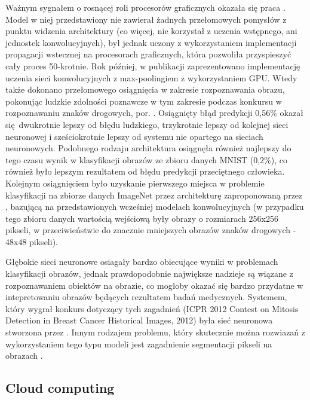 \documentclass[12pt,a4paper,twoside]{article}
\begin{document}
Ważnym sygnałem o rosnącej roli procesorów graficznych okazała się praca \citet{ciresan2010}. Model w niej przedstawiony nie zawierał żadnych przełomowych pomysłów z punktu widzenia architektury (co więcej, nie korzystał z uczenia wstępnego, ani jednostek konwolucyjnych), był jednak uczony z wykorzystaniem implementacji propagacji wstecznej na procesorach graficznych, która pozwoliła przyspieszyć cały proces 50-krotnie. Rok później, w publikacji \citet{ciresan2011a} zaprezentowano implementację uczenia sieci konwolucyjnych z max-poolingiem z wykorzystaniem GPU. Wtedy także dokonano przełomowego osiągnięcia w zakresie rozpoznawania obrazu, pokonując ludzkie zdolności poznawcze w tym zakresie podczas konkursu w rozpoznawaniu znaków drogowych, por. \citet{ciresan2011b}. Osiągnięty błąd predykcji 0,56\% okazał się dwukrotnie lepszy od błędu ludzkiego, trzykrotnie lepszy od kolejnej sieci neuronowej i sześciokrotnie lepszy od systemu nie opartego na sieciach neuronowych. Podobnego rodzaju architektura osiągnęła również najlepszy do tego czasu wynik w klasyfikacji obrazów ze zbioru danych MNIST
(0,2\%), co również było lepszym rezultatem od błędu predykcji przeciętnego człowieka.
Kolejnym osiągnięciem było uzyskanie pierwszego miejsca w problemie klasyfikacji na zbiorze danych ImageNet przez architekturę zaproponowaną przez \citet{krizhevsky2012}, bazującą na przedstawionych wcześniej modelach konwolucyjnych (w przypadku tego zbioru danych wartością wejściową były obrazy o rozmiarach 256x256 pikseli, w przeciwieństwie do znacznie mniejszych obrazów znaków drogowych - 48x48 pikseli).

Głębokie sieci neuronowe osiagały bardzo obiecujące wyniki w problemach klasyfikacji obrazów, jednak prawdopodobnie największe nadzieje są wiązane z rozpoznawaniem obiektów na obrazie, co mogłoby okazać się bardzo przydatne w intepretowaniu obrazów będących rezultatem badań medycznych. Systemem, który wygrał konkurs dotyczący tych zagadnień (ICPR 2012 Contest on Mitosis Detection in Breast Cancer Historical Images, 2012) była sieć neuronowa stworzona przez \citet{ciresan2013}. Innym rodzajem problemu, który skutecznie można rozwiazań z wykorzystaniem tego typu modeli jest zagadnienie segmentacji pikseli na obrazach \citep{ciresan2012}.

\clearpage

\subsection{Cloud computing}
\end{document}
